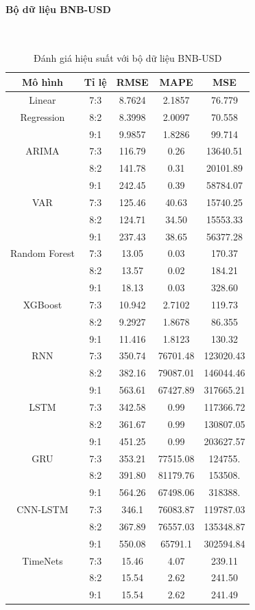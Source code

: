 \documentclass[conference]{IEEEtran}
\begin{document}
\paragraph{\textbf{Bộ dữ liệu BNB-USD}} \mbox{} \\
\begin{table}[H]
 \centering
 \caption{Đánh giá hiệu suất với bộ dữ liệu BNB-USD}
\begin{adjustbox}{width=0.4\textwidth}
\begin{tabular}{|c|c|c|c|c|}
\hline
Mô hình & Tỉ lệ & RMSE & MAPE & MSE \\ \hline
Linear & 7:3 & 8.7624 & 2.1857 & 76.779 \\
Regression & 8:2 & 8.3998 & 2.0097 & 70.558 \\
& 9:1 & 9.9857 & 1.8286 & 99.714 \\ \hline
ARIMA & 7:3 & 116.79 & 0.26 & 13640.51 \\
& 8:2 & 141.78 & 0.31 & 20101.89 \\
& 9:1 &  242.45 & 0.39 & 58784.07 \\ \hline
VAR & 7:3 & 125.46 & 40.63 & 15740.25 \\
& 8:2 & 124.71 & 34.50 & 15553.33 \\
& 9:1 & 237.43 & 38.65 & 56377.28 \\ \hline
Random Forest & 7:3 & 13.05 & 0.03 & 170.37 \\
& 8:2 & 13.57 & 0.02 & 184.21 \\
& 9:1 & 18.13 & 0.03 & 328.60 \\ \hline
XGBoost & 7:3 & 10.942 & 2.7102 & 119.73 \\
& 8:2 & 9.2927 & 1.8678 & 86.355 \\
& 9:1 & 11.416 & 1.8123 & 130.32 \\ \hline
RNN & 7:3 & 350.74 & 76701.48 & 123020.43 \\
& 8:2 & 382.16 & 79087.01 & 146044.46 \\
& 9:1 & 563.61 & 67427.89 & 317665.21 \\ \hline
LSTM & 7:3 & 342.58 & 0.99 & 117366.72 \\
& 8:2 & 361.67 & 0.99 & 130807.05 \\
& 9:1 & 451.25 & 0.99 & 203627.57 \\ \hline
GRU & 7:3 & 353.21 & 77515.08 & 124755. \\
& 8:2 & 391.80 & 81179.76 & 153508. \\
& 9:1 & 564.26 & 67498.06 & 318388. \\ \hline
CNN-LSTM & 7:3 & 346.1 & 76083.87 & 119787.03 \\
& 8:2 & 367.89 & 76557.03 & 135348.87 \\
& 9:1 & 550.08 & 65791.1 & 302594.84 \\ \hline
TimeNets & 7:3 & 15.46 & 4.07 & 239.11 \\
& 8:2 & 15.54 & 2.62 & 241.50 \\
& 9:1 & 15.54 & 2.62 & 241.49 \\ \hline

\end{tabular}
\end{adjustbox}
\end{table}
\end{document}
